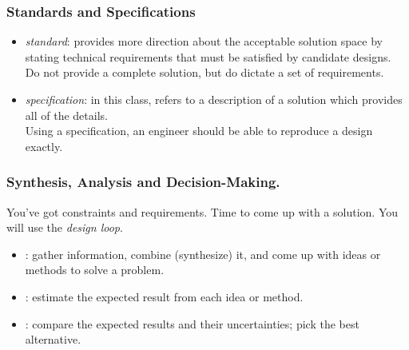\begin{frame}
\frametitle{Standards and Specifications}

\begin{changemargin}{1cm}
\begin{itemize}
\item \emph{standard}: provides more direction about the acceptable
solution space by stating technical requirements that must be satisfied
by candidate designs. \\[1em]

Do not provide a complete solution, but 
do dictate a set of requirements.\\[1em]

\item \emph{specification}: in this class, refers to a description of a solution
which provides all of the details. \\[1em]

Using a specification, an engineer
should be able to reproduce a design exactly.

\end{itemize}
\end{changemargin}

\end{frame}

\begin{frame}

\frametitle{Synthesis, Analysis and Decision-Making.}

\begin{changemargin}{1cm}
You've got constraints and requirements. Time to come up with a solution.
You will use the \emph{design loop}.

\begin{itemize}
\item {}: gather information, combine (synthesize) it, and come up
with ideas or methods to solve a problem.
\item {}: estimate the expected result from each idea or method.
\item {}: compare the expected results and their uncertainties; pick the best alternative.
\end{itemize}
\end{changemargin}

\end{frame}


